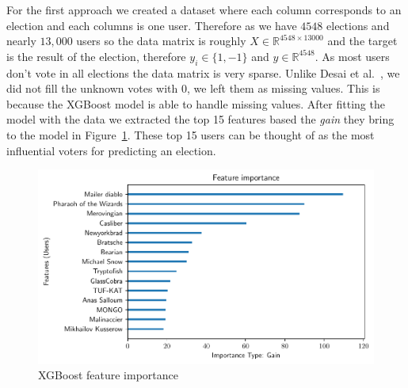 For the first approach we created a dataset where each column corresponds to an election and each columns is one user. Therefore as we have $4548$ elections and nearly $13,000$ users so the data matrix is roughly $X\in \mathbb{R}^{4548\times 13000}$ and the target is the result of the election, therefore $y_i\in \{1,-1\}$ and $y\in \mathbb{R}^{4548}$. As most users don't vote in all elections the data matrix is very sparse. Unlike Desai et al.\ \cite{desai2014result}, we did not fill the unknown votes with 0, we left them as missing values. This is because the XGBoost model is able to handle missing values. After fitting the model with the data we extracted the top 15 features based the \textit{gain} they bring to the model in Figure~\ref{fig:xgboost-feat-importance}. These top 15 users can be thought of as the most influential voters for predicting an election.
\begin{figure}[!ht]
    \centering
    \includegraphics[width=\linewidth]{images/xgboost_features.pdf}
    \caption{XGBoost feature importance}
    \label{fig:xgboost-feat-importance}
\end{figure}

